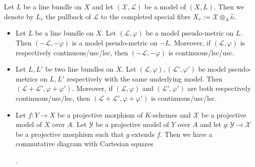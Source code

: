 \documentclass [11pt,reqno]{amsart}
\newcommand{\1}{\mathmybb{1}}
\def\cL{{\mathcal{L}}}
\def\cX{{\mathcal{X}}}
\def\cY{{\mathcal{Y}}}
\def\tilde{\widetilde}
\begin{document}

\begin{notation}
Let $L$ be a line bundle on $X$ and let $(\cX,\cL)$ be a model of $(X,L)$. Then we denote by $L_v$ the pullback of $\cL$ to the completed special fibre $X_v := \cX\otimes_{A} \widehat{\kappa}$.
\end{notation}

\begin{proposition-definition}
\label{propdef:local_model_pseudo-metric}
\begin{itemize}
	\item[(1)] Let $L$ be a line bundle on $X$. Let $(\cL,\varphi)$ be a model pseudo-metric on $L$. Then $(-\cL,-\varphi)$ is a model pseudo-metric on $-L$. Moreover, if $(\cL,\varphi)$ is respectively continuous/usc/lsc, then $(-\cL,-\varphi)$ is continuous/lsc/usc.
	\item[(2)] Let $L,L'$ be two line bundles on $X$. Let $(\cL,\varphi),(\cL',\varphi')$ be model pseudo-metrics on $L,L'$ respectively with the same underlying model. Then $(\cL+ \cL',\varphi + \varphi')$. Moreover, if $(\cL,\varphi)$ and $(\cL',\varphi')$ are both respectively continuous/usc/lsc, then $(\cL+ \cL',\varphi + \varphi')$ is continuous/usc/lsc.
	\item[(3)] Let $f:Y \to X$ be a projective morphism of $K$-schemes and $\cX$ be a projective model of $X$ over $A$. Let $\cY$ be a projective model of $Y$ over $A$ and let $g:\cY \to \cX$ be a projective morphism such that $g$ extends $f$.  Then we have a commutative diagram with Cartesian squares
	\begin{center}
.
	\end{center}

\end{itemize}
\end{proposition-definition}
\end{document}
